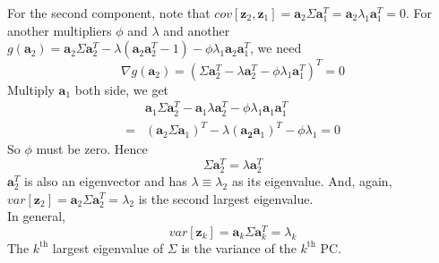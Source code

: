 \documentclass{article}
\begin{document}
            For the second component, note that $cov[\mathbf{z}_2, \mathbf{z}_1]=\mathbf{a}_2\Sigma\mathbf{a}_1^T=\mathbf{a}_2\lambda_1\mathbf{a}_1^T=0$. For another multipliers $\phi$ and $\lambda$ and another $g(\mathbf{a}_2)=\mathbf{a}_2\Sigma\mathbf{a}_2^T-\lambda(\mathbf{a}_2\mathbf{a}_2^T-1)-\phi\lambda_1\mathbf{a}_2\mathbf{a}_1^T$, we need
            \[
                \nabla g(\mathbf{a}_2) = (\Sigma\mathbf{a}_2^T-\lambda\mathbf{a}_2^T-\phi\lambda_1\mathbf{a}_1^T)^T=0
            \]
            Multiply $\mathbf{a}_1$ both side, we get
            \begin{align*}
                &\mathbf{a}_1\Sigma\mathbf{a}_2^T - \mathbf{a}_1\lambda\mathbf{a}_2^T-\phi\lambda_1\mathbf{a}_1\mathbf{a}_1^T\\
                =&(\mathbf{a}_2\Sigma\mathbf{a}_1)^T-\lambda(\mathbf{a_2}\mathbf{a}_1)^T-\phi\lambda_1=0
            \end{align*}
            So $\phi$ must be zero. Hence
            \[
                \Sigma\mathbf{a}_2^T = \lambda\mathbf{a}_2^T
            \]
            $\mathbf{a}_2^T$ is also an eigenvector and has $\lambda\equiv\lambda_2$ as its eigenvalue. And, again, $var[\mathbf{z}_2]=\mathbf{a}_2\Sigma\mathbf{a}_2^T=\lambda_2$ is the second largest eigenvalue.\\[0.2cm]
            In general,
            \[
                var[\mathbf{z}_k]=\mathbf{a}_k\Sigma\mathbf{a}_k^T=\lambda_k
            \]
            The $k^\mathrm{th}$ largest eigenvalue of $\Sigma$ is the variance of the $k^\mathrm{th}$ PC.
\end{document}

